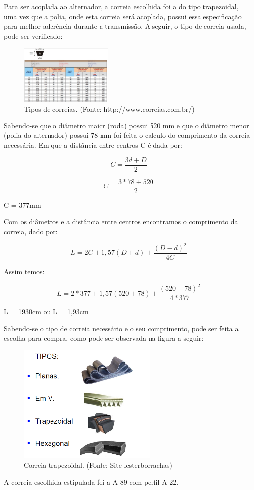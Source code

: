 Para ser acoplada ao alternador, a correia escolhida foi a do tipo trapezoidal, uma vez que a polia, onde esta correia será acoplada, possui essa especificação para melhor aderência durante a transmissão. A seguir, o tipo de correia usada,  pode ser verificado:

\begin{figure}
  \centering
  \includegraphics[width=0.4\textwidth]{figuras/correia}
  \caption{Tipos de correias. (Fonte: http://www.correias.com.br/)}
\end{figure}

Sabendo-se que o diâmetro maior (roda) possui 520 mm e que o diâmetro menor (polia do alternador) possui 78 mm foi feita o calculo do comprimento da correia necessária.
Em que a distância entre centros C é dada por:

\begin{equation}
  C = \frac{3d+D}{2}
\end{equation}

\begin{equation}
 C = \frac{3*78+520}{2}
\end{equation}

C = 377mm


Com os diâmetros e a distância entre centros encontramos o comprimento da correia, dado por:


\begin{equation}
  L = 2C + 1,57(D + d) + \frac{\left ( D - d \right )^{2}}{4C}
\end{equation}


Assim temos:


\begin{equation}
  L = 2*377 + 1,57(520 + 78) +\frac{\left ( 520 - 78 \right )^{2}}{4\ast 377}
\end{equation}

L = 1930cm ou L = 1,93cm

Sabendo-se o tipo de correia necessário e o seu comprimento, pode ser feita a escolha para compra, como pode ser observada na figura a seguir:

\begin{figure}
  \centering
  \includegraphics[width=0.6\textwidth]{figuras/teste}
  \caption{Correia trapezoidal. (Fonte: Site lesterborrachas)}
\end{figure}

A correia escolhida estipulada foi a A-89 com perfil A 22.
